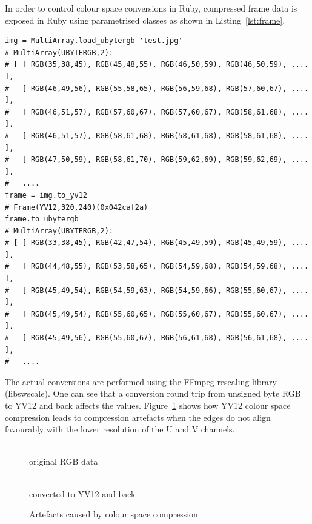 \documentclass[12pt,a4paper,oneside,openright]{book}
\newcommand{\fig}[1]{Figure~\ref{fig:#1}}
\newcommand{\lst}[1]{Listing~\ref{lst:#1}}
\begin{document}
\begin{CJK}{UTF8}{}
In order to control colour space conversions in Ruby, compressed frame data is exposed in Ruby using parametrised classes as shown in \lst{frame}.
\lstset{language=Ruby,frame=single,numbers=none}
\begin{lstlisting}[float,caption={Handling compressed colour spaces},label=lst:frame]
img = MultiArray.load_ubytergb 'test.jpg'
# MultiArray(UBYTERGB,2):
# [ [ RGB(35,38,45), RGB(45,48,55), RGB(46,50,59), RGB(46,50,59), .... ],
#   [ RGB(46,49,56), RGB(55,58,65), RGB(56,59,68), RGB(57,60,67), .... ],
#   [ RGB(46,51,57), RGB(57,60,67), RGB(57,60,67), RGB(58,61,68), .... ],
#   [ RGB(46,51,57), RGB(58,61,68), RGB(58,61,68), RGB(58,61,68), .... ],
#   [ RGB(47,50,59), RGB(58,61,70), RGB(59,62,69), RGB(59,62,69), .... ],
#   ....
frame = img.to_yv12
# Frame(YV12,320,240)(0x042caf2a)
frame.to_ubytergb
# MultiArray(UBYTERGB,2):
# [ [ RGB(33,38,45), RGB(42,47,54), RGB(45,49,59), RGB(45,49,59), .... ],
#   [ RGB(44,48,55), RGB(53,58,65), RGB(54,59,68), RGB(54,59,68), .... ],
#   [ RGB(45,49,54), RGB(54,59,63), RGB(54,59,66), RGB(55,60,67), .... ],
#   [ RGB(45,49,54), RGB(55,60,65), RGB(55,60,67), RGB(55,60,67), .... ],
#   [ RGB(45,49,56), RGB(55,60,67), RGB(56,61,68), RGB(56,61,68), .... ],
#   ....
\end{lstlisting}
The actual conversions are performed using the FFmpeg rescaling library (libswscale). One can see that a conversion round trip from unsigned byte \ac{RGB} to YV12 and back affects the values. \fig{swscale} shows how YV12 colour space compression leads to compression artefacts when the edges do not align favourably with the lower resolution of the \ac{U} and \ac{V} channels.
\begin{figure}[htbp]
  \begin{center}
    \begin{minipage}[t]{.45\textwidth}
      \begin{center}
        \\
        original \acs{RGB} data
      \end{center}
    \end{minipage}
    \hspace{.5cm}
    \begin{minipage}[t]{.45\textwidth}
      \begin{center}
        \resizebox{\textwidth}{!}{\texttt{[image: yv12]}}\\
        converted to YV12 and back
      \end{center}
    \end{minipage}
    \caption{Artefacts caused by colour space compression\label{fig:swscale}}
  \end{center}
\end{figure}


\end{CJK}
\end{document}
